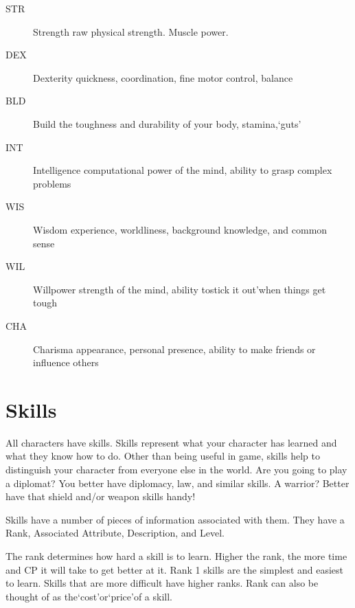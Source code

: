 \documentclass[twoside]{book}
\begin{document}
\begin{description}
    
  \item[STR] 
    {  
    Strength raw physical strength. Muscle power.
    }
  
  \item[DEX] 
    {  
    Dexterity quickness, coordination, fine motor control, balance
    }
  
  \item[BLD] 
    {  
    Build the toughness and durability of your body, stamina,`guts'
    }
  
  \item[INT] 
    {  
    Intelligence computational power of the mind, ability to grasp complex problems
    }
  
  \item[WIS] 
    {  
    Wisdom experience, worldliness, background knowledge, and common sense
    }
  
  \item[WIL] 
    {  
    Willpower strength of the mind, ability tostick it out'when things get tough
    }
  
  \item[CHA] 
    {  
    Charisma appearance, personal presence, ability to make friends or influence others
    }
  
\end{description}
  
    

\section{Skills}
    
    {  
    All characters have skills. Skills represent what your character has learned and what they know how to do. Other than being useful in game, skills help to distinguish your character from everyone else in the world. Are you going to play a diplomat? You better have diplomacy, law, and similar skills. A warrior? Better have that shield and/or weapon skills handy!
    }
  
    {  
    Skills have a number of pieces of information associated with them. They have a Rank, Associated Attribute, Description, and Level.
    }
  
    {  
    The rank determines how hard a skill is to learn. Higher the rank, the more time and CP it will take to get better at it. Rank 1 skills are the simplest and easiest to learn. Skills that are more difficult have higher ranks. Rank can also be thought of as the`cost'or`price'of a skill.
    }
  
\end{document}
